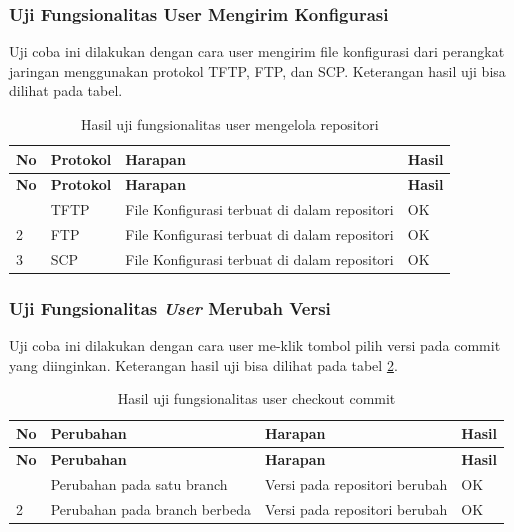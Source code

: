 	\subsubsection{Uji Fungsionalitas User Mengirim Konfigurasi}
    Uji coba ini dilakukan dengan cara user mengirim file konfigurasi dari perangkat jaringan menggunakan protokol TFTP, FTP, dan SCP. Keterangan hasil uji bisa dilihat pada tabel.
    \begin{longtable}{|p{}|p{}|p{}|p{}|}
    	
    	\caption{Hasil uji fungsionalitas user mengelola repositori} \label{hasilmengelolaRepositori} \\
    	\hline
    	\textbf{No} & \textbf{Protokol} & \textbf{Harapan} & \textbf{Hasil} \\ \hline
    	\endfirsthead
    	
    	\hline
    	\textbf{No} & \textbf{Protokol} & \textbf{Harapan} & \textbf{Hasil} \\ \hline
    	\endhead
    	\endfoot
    	\endlastfoot
    	1 & TFTP & File Konfigurasi terbuat di dalam repositori & OK\\ \hline
    	2 & FTP & File Konfigurasi terbuat di dalam repositori & OK\\ \hline
    	3 & SCP & File Konfigurasi terbuat di dalam repositori & OK\\ \hline
    	
    \end{longtable}

	\subsubsection{Uji Fungsionalitas \textit{User} Merubah Versi}
	Uji coba ini dilakukan dengan cara user me-klik tombol pilih versi pada commit yang diinginkan. Keterangan hasil uji bisa dilihat pada tabel \ref{hasilCheckoutCommit}.
	\begin{longtable}{|p{}|p{}|p{}|p{}|}
		
		\caption{Hasil uji fungsionalitas user checkout commit} \label{hasilCheckoutCommit} \\
		\hline
		\textbf{No} & \textbf{Perubahan} & \textbf{Harapan} & \textbf{Hasil} \\ \hline
		\endfirsthead
		\hline
		\textbf{No} & \textbf{Perubahan} & \textbf{Harapan} & \textbf{Hasil} \\ \hline
		\endhead
		\endfoot
		\endlastfoot
		1 & Perubahan pada satu branch & Versi pada repositori berubah & OK\\ \hline
		2 & Perubahan pada branch berbeda & Versi pada repositori berubah & OK\\ \hline
		
	\end{longtable}

